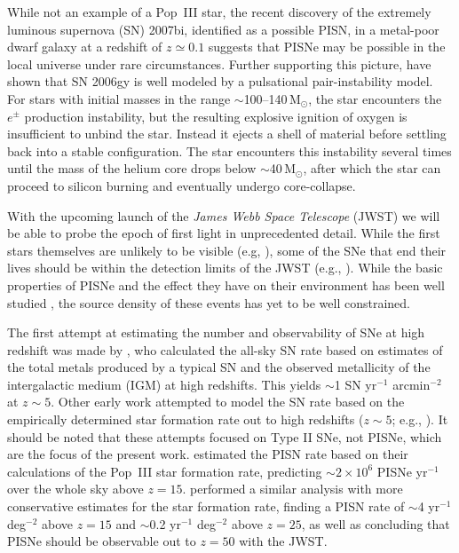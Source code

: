 \documentclass{thesis}
\newcommand{\msun}{\ensuremath{\,\mathrm{M}_{\odot}}\xspace}
\begin{document}
While not an example of a Pop~III star, the recent discovery of the
extremely luminous supernova (SN) 2007bi, identified as a possible
PISN, in a metal-poor dwarf galaxy at a redshift of $z\simeq0.1$
\citep{Gal-Yametal2009} suggests that PISNe may be possible in the
local universe under rare circumstances. Further supporting this
picture, \citet{WoosleyBlinnikovHeger2007} have shown that SN 2006gy
\citep{Smithetal2007} is well modeled by a pulsational
pair-instability model. For stars with initial masses in the range
$\sim$100--140\msun, the star encounters the $e^{\pm}$ production
instability, but the resulting explosive ignition of oxygen is
insufficient to unbind the star.  Instead it ejects a shell of
material before settling back into a stable configuration.  The star
encounters this instability several times until the mass of the helium
core drops below $\sim$40\msun, after which the star can proceed to
silicon burning and eventually undergo core-collapse.

With the upcoming launch of the \textit{James Webb Space Telescope}
(JWST) we will be able to probe the epoch of first light in
unprecedented detail.  While the first stars themselves are unlikely
to be visible (e.g, \citealt{BrommKudritzkiLoeb2001,
  PawlikMilosavljevicBromm2011}), some of the SNe that end their lives
should be within the detection limits of the JWST (e.g.,
\citealt{MackeyBrommHernquist2003, Scannapiecoetal2005,
  Gardneretal2006}). While the basic properties of PISNe and the
effect they have on their environment has been well studied
\citep{MoriFerraraMadau2002, BrommYoshidaHernquist2003,
  FurlanettoLoeb2003, KitayamaYoshida2005, Whalenetal2008,
  WiseAbel2008, Greifetal2010}, the source density of these events has
yet to be well constrained.

The first attempt at estimating the number and observability of SNe at
high redshift was made by \citet{Miralda-EscudeRees1997}, who
calculated the all-sky SN rate based on estimates of the total metals
produced by a typical SN and the observed metallicity of the
intergalactic medium (IGM) at high redshifts.  This yields $\sim$1 SN
yr$^{-1}$ arcmin$^{-2}$ at $z \sim 5$. Other early work attempted to
model the SN rate based on the empirically determined star formation
rate out to high redshifts ($z \sim 5$; e.g.,
\citealt{MadauDellaVallePanagia1998, DahlenFransson1999}).  It should
be noted that these attempts focused on Type II SNe, not PISNe, which
are the focus of the present work. \citet{MackeyBrommHernquist2003}
estimated the PISN rate based on their calculations of the Pop~III
star formation rate, predicting $\sim$$2\times10^6$ PISNe yr$^{-1}$
over the whole sky above $z=15$.  \citet{WeinmannLilly2005} performed
a similar analysis with more conservative estimates for the star
formation rate, finding a PISN rate of $\sim$4 yr$^{-1}$ deg$^{-2}$
above $z=15$ and $\sim$0.2 yr$^{-1}$ deg$^{-2}$ above $z=25$, as well
as concluding that PISNe should be observable out to $z=50$ with the
JWST.
\end{document}
